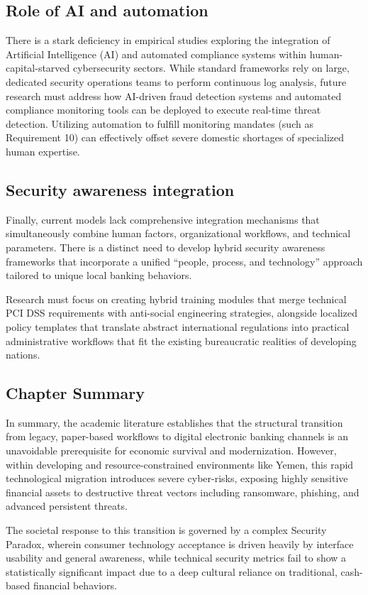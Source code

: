 \documentclass[12pt,a4paper,oneside]{report}
\begin{document}
	\subsection{Role of AI and automation}
	There is a stark deficiency in empirical studies exploring the integration of Artificial Intelligence (AI) and automated compliance systems within human-capital-starved cybersecurity sectors. While standard frameworks rely on large, dedicated security operations teams to perform continuous log analysis, future research must address how AI-driven fraud detection systems and automated compliance monitoring tools can be deployed to execute real-time threat detection. Utilizing automation to fulfill monitoring mandates (such as Requirement 10) can effectively offset severe domestic shortages of specialized human expertise.
	
	\subsection{Security awareness integration}
	Finally, current models lack comprehensive integration mechanisms that simultaneously combine human factors, organizational workflows, and technical parameters. There is a distinct need to develop hybrid security awareness frameworks that incorporate a unified ``people, process, and technology'' approach tailored to unique local banking behaviors. 
	
	Research must focus on creating hybrid training modules that merge technical PCI DSS requirements with anti-social engineering strategies, alongside localized policy templates that translate abstract international regulations into practical administrative workflows that fit the existing bureaucratic realities of developing nations.
	
	\subsection{Chapter Summary}
	In summary, the academic literature establishes that the structural transition from legacy, paper-based workflows to digital electronic banking channels is an unavoidable prerequisite for economic survival and modernization. However, within developing and resource-constrained environments like Yemen, this rapid technological migration introduces severe cyber-risks, exposing highly sensitive financial assets to destructive threat vectors including ransomware, phishing, and advanced persistent threats. 
	
	The societal response to this transition is governed by a complex Security Paradox, wherein consumer technology acceptance is driven heavily by interface usability and general awareness, while technical security metrics fail to show a statistically significant impact due to a deep cultural reliance on traditional, cash-based financial behaviors. 
	
\end{document}
